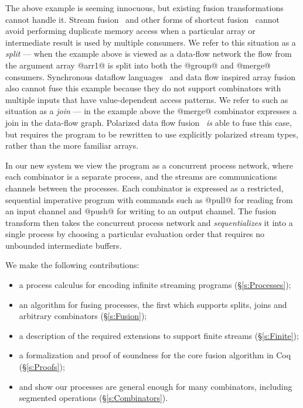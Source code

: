 The above example is seeming innocuous, but existing fusion transformations cannot handle it. Stream fusion~\cite{coutts2007stream} and other forms of shortcut fusion~\cite{jones2001playing} cannot avoid performing duplicate memory access when a particular array or intermediate result is used by multiple consumers. We refer to this situation as a \emph{split} --- when the example above is viewed as a data-flow network the flow from the argument array @arr1@ is split into both the @group@ and @merge@ consumers. Synchronous dataflow languages~\cite{mandel2010lucy} and data flow inspired array fusion~\cite{lippmeier2013data} also cannot fuse this example because they do not support combinators with multiple inputs that have value-dependent access patterns. We refer to such as situation as a \emph{join} --- in the example above the @merge@ combinator expresses a join in the data-flow graph. Polarized data flow fusion~\cite{lippmeier2016polarized} \emph{is} able to fuse this case, but requires the program to be rewritten to use explicitly polarized stream types, rather than the more familiar arrays.

In our new system we view the program as a concurrent process network, where each combinator is a separate process, and the streams are communications channels between the processes. Each combinator is expressed as a restricted, sequential imperative program with commands such as @pull@ for reading from an input channel and @push@ for writing to an output channel. The fusion transform then takes the concurrent process network and \emph{sequentializes} it into a single process by choosing a particular evaluation order that requires no unbounded intermediate buffers. 



We make the following contributions:
\begin{itemize}
\item a process calculus for encoding infinite streaming programs (\S\ref{s:Processes});
\item an algorithm for fusing processes, the first which supports splits, joins and arbitrary combinators (\S\ref{s:Fusion});
\item a description of the required extensions to support finite streams (\S\ref{s:Finite});
\item a formalization and proof of soundness for the core fusion algorithm in Coq (\S\ref{s:Proofs});
\item and show our processes are general enough for many combinators, including segmented operations (\S\ref{s:Combinators}).
\end{itemize}

